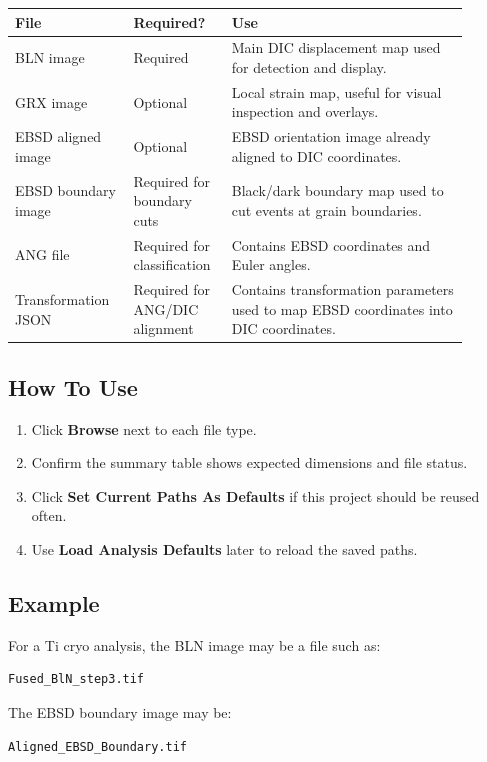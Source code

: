 \documentclass[11pt]{article}
\newcommand{\ui}[1]{\textbf{#1}}
\begin{document}
\begin{longtable}{p{0.24\linewidth}p{0.18\linewidth}p{0.48\linewidth}}
\toprule
\textbf{File} & \textbf{Required?} & \textbf{Use} \\
\midrule
BLN image & Required & Main DIC displacement map used for detection and display. \\
GRX image & Optional & Local strain map, useful for visual inspection and overlays. \\
EBSD aligned image & Optional & EBSD orientation image already aligned to DIC coordinates. \\
EBSD boundary image & Required for boundary cuts & Black/dark boundary map used to cut events at grain boundaries. \\
ANG file & Required for classification & Contains EBSD coordinates and Euler angles. \\
Transformation JSON & Required for ANG/DIC alignment & Contains transformation parameters used to map EBSD coordinates into DIC coordinates. \\
\bottomrule
\end{longtable}

\subsection{How To Use}

\begin{enumerate}
    \item Click \ui{Browse} next to each file type.
    \item Confirm the summary table shows expected dimensions and file status.
    \item Click \ui{Set Current Paths As Defaults} if this project should be reused often.
    \item Use \ui{Load Analysis Defaults} later to reload the saved paths.
\end{enumerate}

\subsection{Example}

For a Ti cryo analysis, the BLN image may be a file such as:

\begin{verbatim}
Fused_BlN_step3.tif
\end{verbatim}

The EBSD boundary image may be:

\begin{verbatim}
Aligned_EBSD_Boundary.tif
\end{verbatim}
\end{document}
